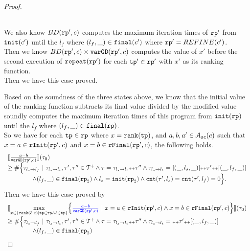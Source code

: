 \begin{proof}
\begin{itemize}
\\
We also know $BD(\mathtt{rp}', c)$ computes the maximum iteration times of $\mathtt{rp}'$ from $\mathtt{init}(c')$ until the $l_f$ where $(l_f, \_) \in \mathtt{final}(c')$ where $\mathtt{rp}' = REFINE(c')$.
\\
Then we know $BD(\mathtt{rp}', c)  \times
{\ensuremath{\mathtt{varGD}}(\ensuremath{\mathtt{rp}}', c)}$
computes the value of $x'$ before the second execution of $\mathtt{repeat}(\mathtt{rp}')$ for each $\mathtt{tp}' \in \mathtt{rp}'$ with $x'$ as its ranking function.
\\
Then we have this case proved.
\end{itemize}
Based on the soundness of the three states above, we know that the initial value of the ranking function
subtracts its final value divided by the modified value soundly computes the maximum iteration times of this program from $\mathtt{init}(\mathtt{rp})$ until the $l_f$ where $(l_f, \_) \in \mathtt{final}(\mathtt{rp})$.
\\
So we have for each $\mathtt{tp} \in \mathtt{rp}$ where $x = \mathtt{rank}(\mathtt{tp})$,
and $a, b, a ' \in \mathcal{A}_{\mathtt{sc}}(c)$
such that $x = a \in \mathtt{rInit}(\mathtt{rp}', c)$ and $x = b \in \mathtt{rFinal}(\mathtt{rp}', c)$,
the following holds.
\[
  \begin{array}{l}
  \llbracket \frac{a - b}{\mathtt{varGD}(\mathtt{rp}', c)} \rrbracket(\mathtt{\tau}_0) 
  \\ \geq
    \# \Big\{\mathtt{\tau}_{l_s \to l_f} ~\vert~ \mathtt{\tau}_{l_s \to l_t}, \mathtt{\tau}', \mathtt{\tau}''\in \mathcal{T}^{+}
    \land \mathtt{\tau} = \mathtt{\tau}_{l_s \to l_t} {\scriptscriptstyle ++} \mathtt{\tau}''
    \land \mathtt{\tau}_{l_s \to l_t} = [(\_, l_s, \_)] {\scriptscriptstyle ++} \mathtt{\tau}' {\scriptscriptstyle ++} [(\_, l_f, \_)]
    \\ \qquad \qquad
    \land (l_{f}, \_) \in \mathtt{final}(\mathtt{rp}_2)
    \land l_s = \mathtt{init}(\mathtt{rp}_2)
    \land \mathtt{cnt}(\mathtt{\tau}', l_s) = \mathtt{cnt}(\mathtt{\tau}', l_f) = 0 
    \Big\}.
    \end{array}
\]
Then we have this case proved by
\[
  \begin{array}{l}
    \econfig{
      \max\limits_{x \in \left\{ \locbound(\absevent, c) | \tpath \in \rprog \land \absevent \in \tpath \right\}}
      \left\{ \highlight{\frac{a - b}{\varGD(\rprog', c)}} ~\vert~
      x = a \in \rfinit(\rprog', c)
      \land x = b \in \rffinal(\rprog', c)
      \right\} 
    }(\trace_0) \\
    \geq
    \# \Big\{\trace_{l_s \to l_f} ~\vert~ \trace_{l_s \to l_t}, \trace', \trace''\in \ftdom
    \land \trace = \trace_{l_s \to l_t} \tracecat \trace''
    \land \trace_{l_s \to l_t} = \tracecat \trace' \tracecat [(\_, l_f, \_)]
    \\ \qquad \qquad
    \land (l_{f}, \_) \in \absfinal(\rprog_2)

\end{array}\]
\end{proof}
